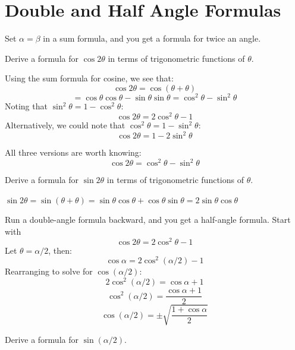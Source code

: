 \section{Double and Half Angle Formulas}
Set $\alpha = \beta$ in a sum formula, and
you get a formula for twice an angle. 

\begin{Worked}
\begin{Problem}
Derive a formula for $\cos{2\theta}$ in terms of 
trigonometric functions of $\theta$.
\end{Problem}
\begin{Solution}
Using the sum formula for cosine, we see that:
$$\cos{2\theta} = \cos{\left( \theta + \theta \right)}$$
$$= \cos{\theta}\cos{\theta} - \sin{\theta}\sin{\theta} = \cos^2{\theta} - 
\sin^2{\theta}$$
Noting that $\sin^2{\theta} = 1 - \cos^2{\theta}$:
$$\boxed{\cos{2\theta} = 2\cos^2{\theta} - 1}$$
Alternatively, we could note that $\cos^2{\theta} = 1 - \sin^2{\theta}$:
$$\boxed{\cos{2\theta} = 1 - 2\sin^2{\theta}}$$

All three versions are worth knowing:
$$\boxed{\cos{2\theta} = \cos^2\theta - \sin^2\theta}$$
\end{Solution}
\end{Worked}

\begin{Exercise}[label = double_sine]
Derive a formula for $\sin{2\theta}$ in terms of trigonometric functions of 
$\theta$.
\vspace{50mm}
\end{Exercise}

\begin{Answer}[ref = double_sine]
$\sin{2\theta} = \sin(\theta + \theta) = \sin{\theta}\cos{\theta} + \cos{
\theta}\sin{\theta} = 2\sin{\theta}\cos{\theta}$
\end{Answer}

Run a double-angle formula backward, and you
get a half-angle formula. Start with
$$\cos{2\theta} = 2\cos^2{\theta} - 1$$
Let $\theta = \alpha / 2$, then:
$$\cos{\alpha} = 2\cos^2{ \left( \alpha / 2 \right) } - 1$$
Rearranging to solve for $\cos{ \left( \alpha / 2 \right) }$:
$$2\cos^2{ \left( \alpha / 2 \right) } = \cos{\alpha} + 1$$
$$\cos^2{ \left( \alpha / 2 \right)} = \frac{\cos{\alpha} + 1}{2}$$
$$\cos{ \left( \alpha / 2 \right)} = \pm \sqrt{\frac{1 + \cos{\alpha}}{2}}$$

\begin{Exercise}[label = half_sine]
Derive a formula for $\sin{ \left( \alpha / 2 \right)}$.
\vspace{75mm}
\end{Exercise}

